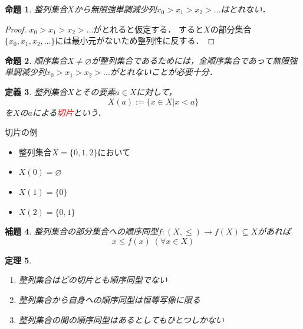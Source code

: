 \documentclass[dvipdfmx,17pt]{beamer}
\renewcommand{\subset}{\subseteq}
\renewcommand{\emptyset}{\varnothing}
\theoremstyle{plain}
\newtheorem{thm}{定理}
\newtheorem{defi}[thm]{定義}
\newtheorem{lem}[thm]{補題}
\newtheorem{prop}[thm]{命題}
\begin{document}
\begin{frame}
\begin{prop}
整列集合$X$から無限強単調減少列$x_0 > x_1 > x_2 > \dots$はとれない．
\end{prop}
\begin{proof}
$x_0 > x_1 > x_2 > \dots$がとれると仮定する．
すると$X$の部分集合$\{x_0, x_1, x_2, \dots\}$には最小元がないため整列性に反する．
\end{proof}
\end{frame}

\begin{frame}
\begin{prop}
順序集合$X \ne \emptyset$が整列集合であるためには，全順序集合であって無限強単調減少列$x_0 > x_1 > x_2 > \dots$がとれないことが必要十分．
\end{prop}
\end{frame}

\begin{frame}
\begin{defi}
整列集合$X$とその要素$a \in X$に対して，
\[X(a) := \{x \in X | x < a \}\]
を$X$の$a$による\textcolor{red}{切片}という．
\end{defi}
\end{frame}

\begin{frame}{切片の例}
\begin{itemize}
\item 整列集合$X = \{0, 1, 2\}$において
\item $X(0) = \emptyset$
\item $X(1) = \{0\}$
\item $X(2) = \{0, 1\}$
\end{itemize}
\end{frame}

\begin{frame}
\begin{lem}
整列集合の部分集合への順序同型$f: (X, \le) \to f(X) \subset X$があれば
\[x \le f(x) \;(\forall x  \in X)\]
\end{lem}
\end{frame}

\begin{frame}
\begin{thm}
\begin{enumerate}
\item 整列集合はどの切片とも順序同型でない
 \item 整列集合から自身への順序同型は恒等写像に限る
 \item 整列集合の間の順序同型はあるとしてもひとつしかない
\end{enumerate}
\end{thm}
\end{frame}
\end{document}
